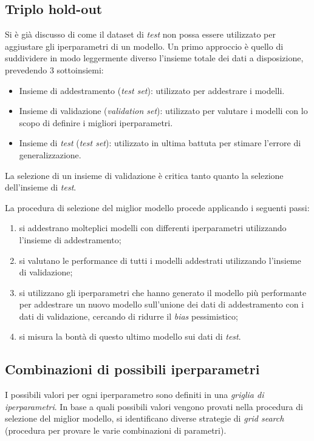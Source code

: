 \subsection{Triplo hold-out}
Si è già discusso di come il dataset di \emph{test} non possa essere utilizzato per aggiustare gli iperparametri di un modello.
Un primo approccio è quello di suddividere in modo leggermente diverso l'insieme totale dei dati a disposizione, prevedendo 3 sottoinsiemi: 
\begin{itemize}
    \item Insieme di addestramento (\emph{test set}): utilizzato per addestrare i modelli.
    \item Insieme di validazione (\emph{validation set}): utilizzato per valutare i modelli con lo scopo di definire i migliori iperparametri.
    \item Insieme di \emph{test} (\emph{test set}): utilizzato in ultima battuta per stimare l'errore di generalizzazione.
\end{itemize}
La selezione di un insieme di validazione è critica tanto quanto la selezione dell'insieme di \emph{test}.

La procedura di selezione del miglior modello procede applicando i seguenti passi:
\begin{enumerate}
    \item si addestrano molteplici modelli con differenti iperparametri utilizzando l'insieme di addestramento;
    \item si valutano le performance di tutti i modelli addestrati utilizzando l'insieme di validazione;
    \item si utilizzano gli iperparametri che hanno generato il modello più performante per addestrare un nuovo modello sull'unione dei dati di addestramento con i dati di validazione, cercando di ridurre il \emph{bias} pessimistico;
    \item si misura la bontà di questo ultimo modello sui dati di \emph{test}.
\end{enumerate}

\subsection{Combinazioni di possibili iperparametri}
I possibili valori per ogni iperparametro sono definiti in una \emph{griglia di iperparametri}.
In base a quali possibili valori vengono provati nella procedura di selezione del miglior modello, si identificano diverse strategie di \emph{grid search} (procedura per provare le varie combinazioni di parametri).

